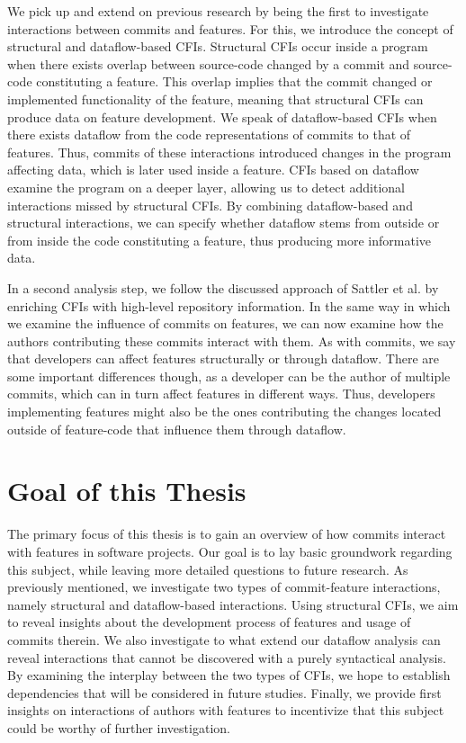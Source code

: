 We pick up and extend on previous research by being the first to investigate interactions between commits and features.
For this, we introduce the concept of structural and dataflow-based CFIs.
Structural CFIs occur inside a program when there exists overlap between source-code changed by a commit and source-code constituting a feature.
This overlap implies that the commit changed or implemented functionality of the feature, meaning that structural CFIs can produce data on feature development.
We speak of dataflow-based CFIs when there exists dataflow from the code representations of commits to that of features.
Thus, commits of these interactions introduced changes in the program affecting data, which is later used inside a feature.
CFIs based on dataflow examine the program on a deeper layer, allowing us to detect additional interactions missed by structural CFIs.
By combining dataflow-based and structural interactions, we can specify whether dataflow stems from outside or from inside the code constituting a feature, thus producing more informative data.

In a second analysis step, we follow the discussed approach of Sattler et al. by enriching CFIs with high-level repository information.
In the same way in which we examine the influence of commits on features, we can now examine how the authors contributing these commits interact with them.
As with commits, we say that developers can affect features structurally or through dataflow.
There are some important differences though, as a developer can be the author of multiple commits, which can in turn affect features in different ways.
Thus, developers implementing features might also be the ones contributing the changes located outside of feature-code that influence them through dataflow.

\section{Goal of this Thesis}

The primary focus of this thesis is to gain an overview of how commits interact with features in software projects. 
Our goal is to lay basic groundwork regarding this subject, while leaving more detailed questions to future research. 
As previously mentioned, we investigate two types of commit-feature interactions, namely structural and dataflow-based interactions. 
Using structural CFIs, we aim to reveal insights about the development process of features and usage of commits therein. 
We also investigate to what extend our dataflow analysis can reveal interactions that cannot be discovered with a purely syntactical analysis.
By examining the interplay between the two types of CFIs, we hope to establish dependencies that will be considered in future studies.
Finally, we provide first insights on interactions of authors with features to incentivize that this subject could be worthy of further investigation.

